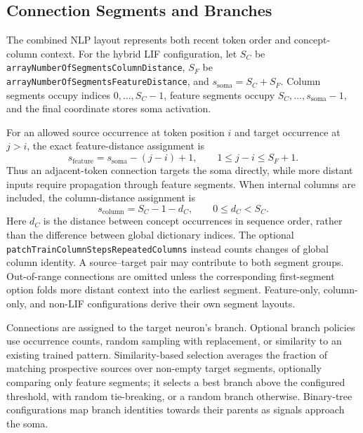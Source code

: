 \subsection{Connection Segments and Branches}
The combined NLP layout represents both recent token order and concept-column context. For the hybrid LIF configuration, let $S_C$ be \texttt{arrayNumberOfSegmentsColumnDistance}, $S_F$ be \texttt{arrayNumberOfSegmentsFeatureDistance}, and $s_{\mathrm{soma}}=S_C+S_F$. Column segments occupy indices $0,\ldots,S_C-1$, feature segments occupy $S_C,\ldots,s_{\mathrm{soma}}-1$, and the final coordinate stores soma activation.

For an allowed source occurrence at token position $i$ and target occurrence at $j>i$, the exact feature-distance assignment is
\[
	s_{\mathrm{feature}}=s_{\mathrm{soma}}-(j-i)+1, \qquad 1\leq j-i\leq S_F+1.
\]
Thus an adjacent-token connection targets the soma directly, while more distant inputs require propagation through feature segments. When internal columns are included, the column-distance assignment is
\[
	s_{\mathrm{column}}=S_C-1-d_C, \qquad 0\leq d_C<S_C.
\]
Here $d_C$ is the distance between concept occurrences in sequence order, rather than the difference between global dictionary indices. The optional \texttt{patchTrainColumnStepsRepeatedColumns} instead counts changes of global column identity. A source--target pair may contribute to both segment groups. Out-of-range connections are omitted unless the corresponding first-segment option folds more distant context into the earliest segment. Feature-only, column-only, and non-LIF configurations derive their own segment layouts.

Connections are assigned to the target neuron's branch. Optional branch policies use occurrence counts, random sampling with replacement, or similarity to an existing trained pattern. Similarity-based selection averages the fraction of matching prospective sources over non-empty target segments, optionally comparing only feature segments; it selects a best branch above the configured threshold, with random tie-breaking, or a random branch otherwise. Binary-tree configurations map branch identities towards their parents as signals approach the soma.


